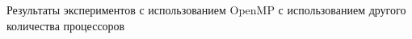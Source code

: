 \documentclass[hyperref=unicode,graphics=pdflatex,13pt]{beamer}
\begin{document}
\begin{frame}[shrink]{Результаты экспериментов с использованием OpenMP с использованием другого количества процессоров}
\begin{center}
\begin{figure}
\centering
{}
\end{figure}
\end{center}
\end{frame}
\end{document}
